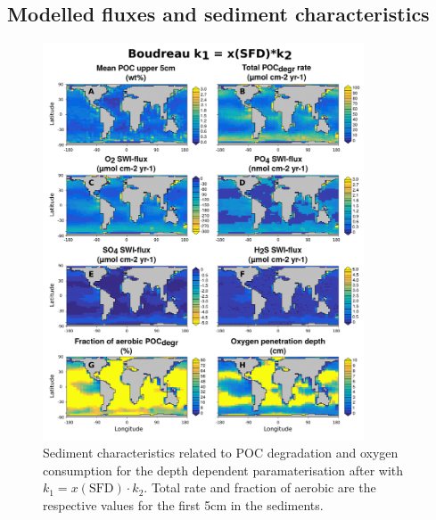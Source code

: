 \documentclass[gmd, manuscript]{copernicus}
\begin{document}
\subsection{Modelled fluxes and sediment characteristics}\label{subsec:fluxes_sed_charac}
\begin{figure}[htbp]
\begin{center}
	\includegraphics[width=0.85\textwidth]{figures/OMEN-GENIE-Exp/0_2908_Boudreau_Depth_SED_PROPS_AND_FLUXES_1009_LINES.pdf}
	\caption{Sediment characteristics related to POC degradation and oxygen consumption for the depth dependent paramaterisation after \citet{boudreau1997diagenetic} with $k_1 = x(\mathrm{SFD}) \cdot k_2$.
	Total  rate and fraction of aerobic  are the respective values for the first 5cm in the sediments. 
	}\label{fig:OMEN_GENIE_best_fit_invariant}
\end{center}
\end{figure}

\end{document}
